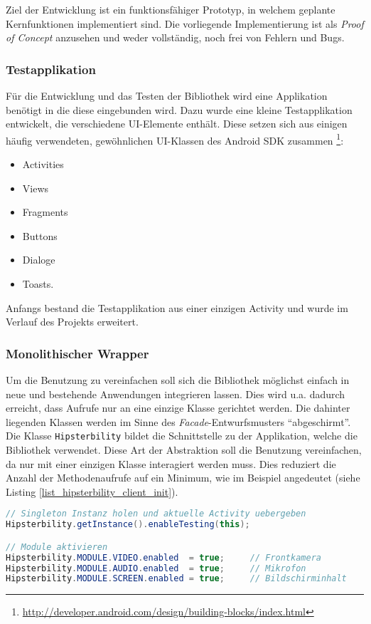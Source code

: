 Ziel der Entwicklung ist ein funktionsfähiger Prototyp, in welchem geplante Kernfunktionen implementiert sind.
Die vorliegende Implementierung ist als \emph{Proof of Concept} anzusehen und weder vollständig, noch frei von Fehlern und Bugs.

\subsubsection{Testapplikation}
Für die Entwicklung und das Testen der Bibliothek wird eine Applikation benötigt in die diese eingebunden wird.
Dazu wurde eine kleine Testapplikation entwickelt, die verschiedene \ac{UI}-Elemente enthält.
Diese setzen sich aus einigen häufig verwendeten, gewöhnlichen \ac{UI}-Klassen des Android \ac{SDK} zusammen \footnote{\url{http://developer.android.com/design/building-blocks/index.html}}:
\begin{itemize}
	\item Activities
	\item Views
	\item Fragments
	\item Buttons
	\item Dialoge
	\item Toasts.
\end{itemize}
Anfangs bestand die Testapplikation aus einer einzigen Activity und wurde im Verlauf des Projekts erweitert.


\subsubsection{Monolithischer Wrapper}
Um die Benutzung zu vereinfachen soll sich die Bibliothek möglichst einfach in neue und bestehende Anwendungen integrieren lassen.
Dies wird u.a. dadurch erreicht, dass Aufrufe nur an eine einzige Klasse gerichtet werden.
Die dahinter liegenden Klassen werden im Sinne des \emph{Facade}-Entwurfsmusters \cite[vgl.][40\psq]{designpattern} \enquote{abgeschirmt}.
Die Klasse \texttt{Hipsterbility} bildet die Schnittstelle zu der Applikation, welche die Bibliothek verwendet.
Diese Art der Abstraktion soll die Benutzung vereinfachen, da nur mit einer einzigen Klasse interagiert werden muss. 
Dies reduziert die Anzahl der Methodenaufrufe auf ein Minimum, wie im Beispiel angedeutet (siehe Listing \ref{list_hipsterbility_client_init}).

\begin{lstlisting}[label=list_hipsterbility_client_init,language=Java, caption=Beispiel für Initialisierung der Bibliothek]
// Singleton Instanz holen und aktuelle Activity uebergeben
Hipsterbility.getInstance().enableTesting(this);

// Module aktivieren
Hipsterbility.MODULE.VIDEO.enabled 	= true; 	// Frontkamera
Hipsterbility.MODULE.AUDIO.enabled 	= true;		// Mikrofon
Hipsterbility.MODULE.SCREEN.enabled = true;		// Bildschirminhalt
\end{lstlisting}

